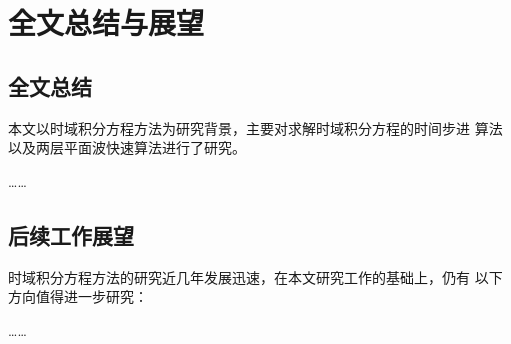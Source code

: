 
\chapter{全文总结与展望}

\section{全文总结}
本文以时域积分方程方法为研究背景，主要对求解时域积分方程的时间步进
算法以及两层平面波快速算法进行了研究。

……
\section{后续工作展望}
时域积分方程方法的研究近几年发展迅速，在本文研究工作的基础上，仍有
以下方向值得进一步研究：

……